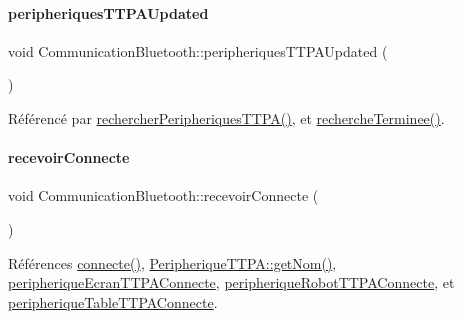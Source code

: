 \mbox{\label{class_communication_bluetooth_aab8b17e2574afe3ea0ee390a7d63c7a4}} 
\paragraph{\texorpdfstring{peripheriques\+T\+T\+P\+A\+Updated}{peripheriquesTTPAUpdated}}
{\footnotesize\ttfamily void Communication\+Bluetooth\+::peripheriques\+T\+T\+P\+A\+Updated (\begin{DoxyParamCaption}{ }\end{DoxyParamCaption})\hspace{0.3cm}{\ttfamily [signal]}}



Référencé par \hyperlink{class_communication_bluetooth_a4c2e2d557728c227faeb247cb8a9c482}{rechercher\+Peripheriques\+T\+T\+P\+A()}, et \hyperlink{class_communication_bluetooth_a79ee5a5bcaaf265048f1213b5504f146}{recherche\+Terminee()}.

\mbox{\label{class_communication_bluetooth_aee7edc20fc1fdfd5a5a1c228c1319531}} 
\paragraph{\texorpdfstring{recevoir\+Connecte}{recevoirConnecte}}
{\footnotesize\ttfamily void Communication\+Bluetooth\+::recevoir\+Connecte (\begin{DoxyParamCaption}{ }\end{DoxyParamCaption})\hspace{0.3cm}{\ttfamily [slot]}}



Références \hyperlink{class_communication_bluetooth_a76f44488775d68071d43b418a7a1c75e}{connecte()}, \hyperlink{class_peripherique_t_t_p_a_abb04680791a7e778ac3808b5d218421f}{Peripherique\+T\+T\+P\+A\+::get\+Nom()}, \hyperlink{class_communication_bluetooth_ace9f69a994a3e9bbaab18ef48ff0f6a3}{peripherique\+Ecran\+T\+T\+P\+A\+Connecte}, \hyperlink{class_communication_bluetooth_a451b47553dd5cf716e8825c0fc0c203b}{peripherique\+Robot\+T\+T\+P\+A\+Connecte}, et \hyperlink{class_communication_bluetooth_a3b2e75b95ad66dd46d6b1268694c74dc}{peripherique\+Table\+T\+T\+P\+A\+Connecte}.




